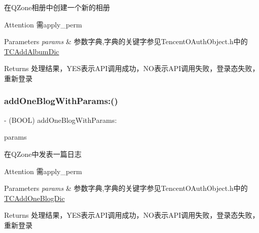 在\+Q\+Zone相册中创建一个新的相册 \begin{DoxyAttention}{Attention}
需apply\+\_\+perm 
\end{DoxyAttention}

\begin{DoxyParams}{Parameters}
{\em params} & 参数字典,字典的关键字参见\+Tencent\+O\+Auth\+Object.\+h中的\mbox{\hyperlink{interface_t_c_add_album_dic}{T\+C\+Add\+Album\+Dic}} \\
\hline
\end{DoxyParams}
\begin{DoxyReturn}{Returns}
处理结果，\+Y\+E\+S表示\+A\+P\+I调用成功，\+N\+O表示\+A\+P\+I调用失败，登录态失败，重新登录 
\end{DoxyReturn}
\mbox{\label{interface_tencent_o_auth_a18bddf0cc13d3d6518bebbe9150457e0}} 
\subsubsection{\texorpdfstring{add\+One\+Blog\+With\+Params\+:()}{addOneBlogWithParams:()}\hspace{0.1cm}{\footnotesize\ttfamily [1/2]}}
{\footnotesize\ttfamily -\/ (B\+O\+OL) add\+One\+Blog\+With\+Params\+: \begin{DoxyParamCaption}\item[{(N\+S\+Mutable\+Dictionary $\ast$)}]{params }\end{DoxyParamCaption}}

在\+Q\+Zone中发表一篇日志 \begin{DoxyAttention}{Attention}
需apply\+\_\+perm 
\end{DoxyAttention}

\begin{DoxyParams}{Parameters}
{\em params} & 参数字典,字典的关键字参见\+Tencent\+O\+Auth\+Object.\+h中的\mbox{\hyperlink{interface_t_c_add_one_blog_dic}{T\+C\+Add\+One\+Blog\+Dic}} \\
\hline
\end{DoxyParams}
\begin{DoxyReturn}{Returns}
处理结果，\+Y\+E\+S表示\+A\+P\+I调用成功，\+N\+O表示\+A\+P\+I调用失败，登录态失败，重新登录 
\end{DoxyReturn}
\mbox{\label{interface_tencent_o_auth_a18bddf0cc13d3d6518bebbe9150457e0}} 
